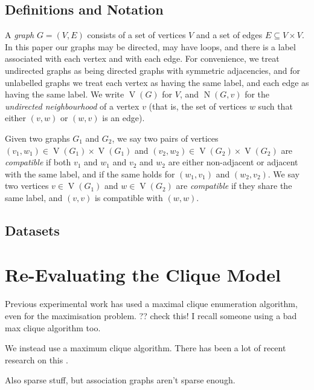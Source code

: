 \documentclass{llncs}
\begin{document}
\subsection{Definitions and Notation}

A \emph{graph} $G = (V, E)$ consists of a set of vertices $V$ and a set of edges $E \subseteq V
\times V$. In this paper our graphs may be directed, may have loops, and there is a label associated
with each vertex and with each edge. For convenience, we treat undirected graphs as being directed
graphs with symmetric adjacencies, and for unlabelled graphs we treat each vertex as having the same
label, and each edge as having the same label. We write $\operatorname{V}(G)$ for $V$, and
$\operatorname{N}(G, v)$ for the \emph{undirected neighbourhood} of a vertex $v$ (that is, the set
of vertices $w$ such that either $(v, w)$ or $(w, v)$ is an edge).

Given two graphs $G_1$ and $G_2$, we say two pairs of vertices $(v_1, w_1) \in \operatorname{V}(G_1)
\times \operatorname{V}(G_1)$ and $(v_2, w_2) \in \operatorname{V}(G_2) \times
\operatorname{V}(G_2)$ are \emph{compatible} if both $v_1$ and $w_1$ and $v_2$ and $w_2$ are either
non-adjacent or adjacent with the same label, and if the same holds for $(w_1, v_1)$ and $(w_2,
v_2)$.  We say two vertices $v \in \operatorname{V}(G_1)$ and $w \in \operatorname{V}(G_2)$ are
\emph{compatible} if they share the same label, and $(v, v)$ is compatible with $(w, w)$.

\subsection{Datasets}

\cite{DBLP:journals/prl/SantoFSV03,DBLP:journals/jgaa/ConteFV07}

\section{Re-Evaluating the Clique Model}

Previous experimental work has used a maximal clique enumeration algorithm, even for the
maximisation problem. ?? check this! I recall someone using a bad max clique algorithm too.
\cite{DBLP:conf/sspr/BunkeFGSV02,DBLP:journals/jgaa/ConteFV07}

We instead use a maximum clique algorithm. There has been a lot of recent
research on this
.

Also sparse stuff, but association graphs aren't sparse enough.
\end{document}
